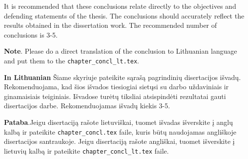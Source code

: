 It is recommended that these conclusions relate directly to the objectives and defending statements of the thesis. 
The conclusions should accurately reflect the results obtained in the dissertation work.
The recommended number of conclusions is 3-5.

\textbf{Note}. Please do a direct translation of the conclusion to Lithuanian language and put them to the \verb|chapter_concl_lt.tex|.


\textbf{In Lithuanian} Šiame skyriuje pateikite sąrašą pagrindinių disertacijos išvadų. Rekomenduojama, kad šios išvados tiesiogiai sietųsi su darbo uždaviniais ir ginamaisiais teiginiais. Išvadose turėtų tiksliai atsispindėti rezultatai gauti disertacijos darbe. 
Rekomenduojamas išvadų kiekis 3-5.

\textbf{Pataba}.Jeigu disertaciją rašote lietuviškai, tuomet išvadas išverskite į anglų kalbą ir pateikite \verb|chapter_concl.tex| faile, kuris būtų naudojamas angliškoje disertacijos santraukoje.
Jeigu disertaciją rašote angliškai, tuomet išverskite į lietuvių kalbą ir pateikite \verb|chapter_concl_lt.tex| faile.